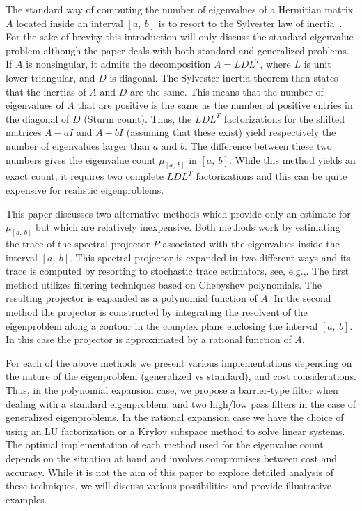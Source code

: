 \documentclass[12pt]{article}		\usepackage{tabls,multirow}
\newcommand{\ab}{[a, \ b]}
\begin{document}
The standard way of computing the number of eigenvalues 
of a Hermitian matrix $A$ located inside
an interval $\ab$ is to resort to the Sylvester law of
inertia~\cite{GVL-book}.  For the sake
of brevity this introduction will only  discuss the standard eigenvalue problem
although the paper deals with both standard and
generalized problems. 
If $A$ is nonsingular, it admits the
decomposition $A = L D L^T$, where $L$ is unit lower triangular, and
$D$ is diagonal. The Sylvester inertia theorem then states that the
inertias of $A$ and $D$ are the same. This means that the number of
eigenvalues of $A$ that are positive is the same as the number of
positive entries in the diagonal of $D$ (Sturm count). Thus, the
$LDL^T$ factorizations for the shifted matrices $A - a I$ and $A - b
I$ (assuming that these exist) yield respectively the number of
eigenvalues larger than $a$ and $b$. The difference between these two
numbers gives the eigenvalue count $\mu_{\ab}$ in $\ab$. While
this method yields an exact count, it requires two complete $LDL^T$
factorizations and this can be quite expensive for realistic
eigenproblems.

This paper discusses two alternative methods which provide only an
estimate for $\mu_{\ab}$ but which are relatively inexpensive. Both
methods work by estimating the trace of the spectral projector $P$
associated with the eigenvalues inside the interval $\ab$.  This
spectral projector is expanded in two different ways and its trace is
computed by resorting to stochastic trace estimators, see,
e.g.,\cite{Hutchinson-est,JTangYS}.  The first method utilizes
filtering techniques based on Chebyshev polynomials. The resulting
projector is expanded as a polynomial function of $A$.  In the second
method the projector is constructed by integrating the resolvent of
the eigenproblem along a contour in the complex plane enclosing the
interval $\ab$. In this case the projector is approximated by a
rational function of $A$.  

For each of the above methods we present various implementations
depending on the nature of the eigenproblem (generalized vs standard),
and cost considerations.  Thus, in the polynomial expansion case, we
propose a barrier-type filter when dealing with a standard
eigenproblem, and two high/low pass filters in the case of generalized
eigenproblems. In the rational expansion case we have the choice of
using an LU factorization or a Krylov subspace method to solve linear
systems. The optimal implementation of each method used for the
eigenvalue count depends on the situation at hand and involves
compromises between cost and accuracy. 
While it is not the aim of this
paper to explore detailed analysis of these techniques, we will
discuss various possibilities and provide illustrative examples.
\end{document}
